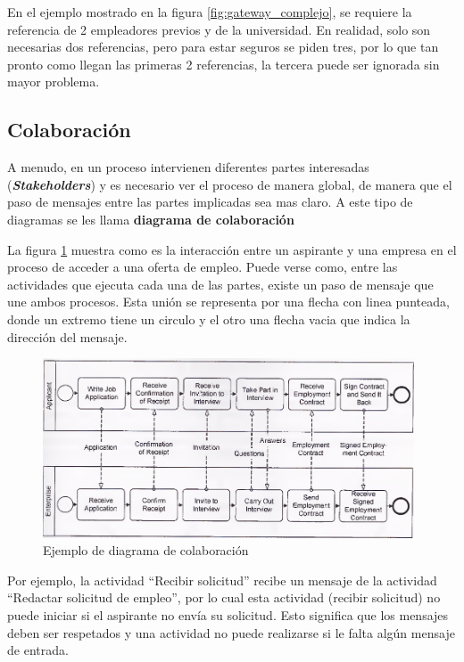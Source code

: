 En el ejemplo mostrado en la figura \ref{fig:gateway_complejo}, se requiere la referencia de 2 empleadores previos y de la universidad. En realidad, solo son necesarias dos referencias, pero para estar seguros se piden tres, por lo que tan pronto como llegan las primeras 2 referencias, la tercera puede ser ignorada sin mayor problema.

\subsection{Colaboración}

A menudo, en un proceso intervienen diferentes partes interesadas (\textbf{\textit{Stakeholders}}) y es necesario ver el proceso de manera global, de manera que el paso de mensajes entre las partes implicadas sea mas claro. A este tipo de diagramas se les llama \textbf{diagrama de colaboración}

La figura \ref{fig:diagrama_colaboracion} muestra como es la interacción entre un aspirante y una empresa en el proceso de acceder a una oferta de empleo. Puede verse como, entre las actividades que ejecuta cada una de las partes, existe un paso de mensaje que une ambos procesos. Esta unión se representa por una flecha con linea punteada, donde un extremo tiene un circulo y el otro una flecha vacia que indica la dirección del mensaje.

\begin{figure}[!htb]
  \begin{center}
    \includegraphics[width=11cm]{./imagenes/diagrama_colaboracion.png}
    \caption{Ejemplo de diagrama de colaboración}
    \label{fig:diagrama_colaboracion}
  \end{center}
\end{figure}

Por ejemplo, la actividad ``Recibir solicitud'' recibe un mensaje de la actividad ``Redactar solicitud de empleo'', por lo cual esta actividad (recibir solicitud) no puede iniciar si el aspirante no envía su solicitud. Esto significa que los mensajes deben ser respetados y una actividad no puede realizarse si le falta algún mensaje de entrada.

